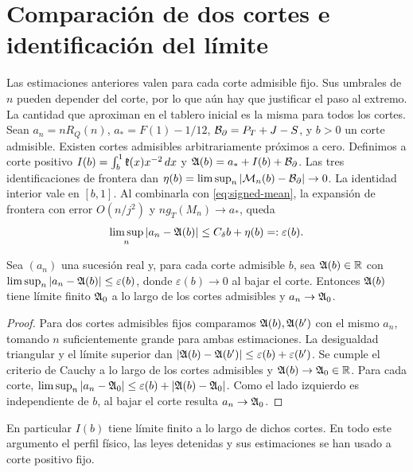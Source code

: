 \section{Comparación de dos cortes e identificación del límite}\label{app:closing}
Las estimaciones anteriores valen para cada corte admisible fijo. Sus umbrales de \(n\)
pueden depender del corte, por lo que aún hay que justificar el paso al extremo.
La cantidad que aproximan en el tablero inicial es la misma para todos los cortes.
Sean \(a_n=nR_Q(n)\), \(a_*=F(1)-1/12\), \(\mathcal B_{\partial}=P_T+J-S\), y \(b>0\) un corte
admisible. Existen cortes admisibles arbitrariamente próximos a cero. Definimos a corte positivo
\(I(b)=\int_b^1 \mathfrak{k}(x)x^{-2}\,dx\) y \(\mathfrak A(b)=a_*+I(b)+\mathcal B_{\partial}\).
Las tres identificaciones de frontera dan \(\eta(b)=\limsup_n|\mathcal M_n(b)-\mathcal B_{\partial}|\to0\).
La identidad interior vale en \([b,1]\). Al combinarla con \eqref{eq:signed-mean},
la expansión de frontera con error \(O(n/j^2)\) y \(n g_T(M_n)\to a_*\), queda
\[
 \limsup_n|a_n-\mathfrak A(b)|\le C_\delta b+\eta(b)=:\varepsilon(b).
\]
\begin{lema}\label{lem:dos-cortes}
Sea \((a_n)\) una sucesión real y, para cada corte admisible \(b\), sea \(\mathfrak A(b)\in\mathbb R\) con
\(\limsup_n|a_n-\mathfrak A(b)|\le\varepsilon(b)\), donde \(\varepsilon(b)\to0\) al bajar el corte. Entonces
\(\mathfrak A(b)\) tiene límite finito \(\mathfrak A_0\) a lo largo de los cortes admisibles y
 \(a_n\to\mathfrak A_0\).
\end{lema}
\begin{proof}
Para dos cortes admisibles fijos comparamos \(\mathfrak A(b),\mathfrak A(b')\) con el mismo \(a_n\),
 tomando \(n\)
suficientemente grande para ambas estimaciones. La desigualdad triangular y el límite superior
dan \(|\mathfrak A(b)-\mathfrak A(b')|\le\varepsilon(b)+\varepsilon(b')\). Se cumple el criterio de Cauchy
 a lo
largo de los cortes admisibles y \(\mathfrak A(b)\to\mathfrak A_0\in\mathbb R\). Para cada corte,
\(\limsup_n|a_n-\mathfrak A_0|\le\varepsilon(b)+|\mathfrak A(b)-\mathfrak A_0|\). Como el lado izquierdo
 es independiente
de \(b\), al bajar el corte resulta \(a_n\to\mathfrak A_0\).
\end{proof}
En particular \(I(b)\) tiene límite finito a lo largo de dichos cortes. En todo este argumento
el perfil físico, las leyes detenidas y sus estimaciones se han usado a corte positivo fijo.



